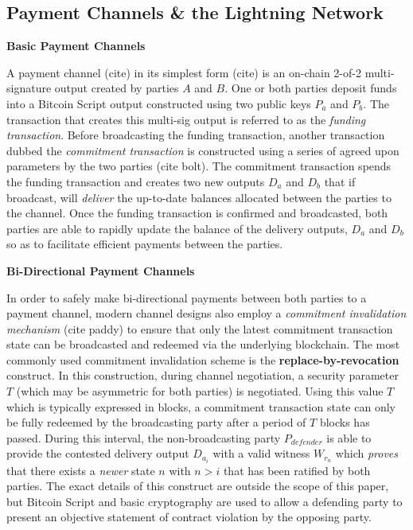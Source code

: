 \documentclass[10pt,a4paper]{article}
\theoremstyle{definition}
\begin{document}
\subsection{Payment Channels \& the Lightning Network} 

\begin{center}
\textbf{Basic Payment Channels}
\end{center}

A payment channel (cite) in its simplest form (cite) is an on-chain 2-of-2
multi-signature output created by parties $A$ and $B$. One or both parties deposit
funds into a Bitcoin Script output constructed using two public
keys $P_{a}$ and $P_{b}$. The transaction that creates this multi-sig output
is referred to as the \emph{funding transaction}. Before broadcasting the funding
transaction, another transaction dubbed the \emph{commitment transaction} is
constructed using a series of agreed upon parameters by the two parties (cite bolt). The
commitment transaction spends the funding transaction and creates two new
outputs $D_{a}$ and $D_{b}$ that if broadcast, will \emph{deliver} the up-to-date balances allocated
between the parties to the channel. Once the funding transaction is confirmed
and broadcasted, both parties are able to rapidly update the balance of the
delivery outputs, $D_{a}$ and $D_{b}$ so as to facilitate efficient payments between the parties. \\

\begin{center}
\textbf{Bi-Directional Payment Channels}
\end{center}

In order to safely make bi-directional payments between both parties to a payment channel, modern
channel designs also employ a \emph{commitment invalidation mechanism} (cite
paddy) to ensure that only the latest commitment transaction state can be
broadcasted and redeemed via the underlying blockchain. The most commonly
used commitment invalidation scheme is the \textbf{replace-by-revocation}
construct. In this construction, during channel negotiation, a security
parameter $T$ (which may be asymmetric for both parties) is negotiated. Using
this value $T$ which is typically expressed in blocks, a commitment transaction
state can only be fully redeemed by the broadcasting party after a period of
$T$ blocks has passed. During this interval, the non-broadcasting party
$P_{defender}$ is able to provide the contested delivery output $D_{a_i}$ with
a valid witness $W_{r_n}$ which \emph{proves} that there exists a  \emph{newer}
state $n$ with $n > i$ that has been ratified by both parties. The exact
details of this construct are outside the scope of this paper, but Bitcoin
Script and basic cryptography are used to allow a defending party to present an
objective statement of contract violation by the opposing party. \\
\end{document}
